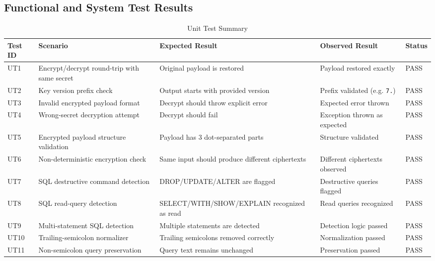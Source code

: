 \subsection{Functional and System Test Results}

\begin{table}[H]
    \centering
    \caption{Unit Test Summary}
    \label{tab:test-summary}
    \begin{tabular}{|p{}|p{}|p{}|p{}|p{}|}
        \hline
        \textbf{Test ID} & \textbf{Scenario} & \textbf{Expected Result} & \textbf{Observed Result} & \textbf{Status} \\
        \hline
        UT1 & Encrypt/decrypt round-trip with same secret & Original payload is restored & Payload restored exactly & PASS \\
        \hline
        UT2 & Key version prefix check & Output starts with provided version & Prefix validated (e.g. \texttt{7.}) & PASS \\
        \hline
        UT3 & Invalid encrypted payload format & Decrypt should throw explicit error & Expected error thrown & PASS \\
        \hline
        UT4 & Wrong-secret decryption attempt & Decrypt should fail & Exception thrown as expected & PASS \\
        \hline
        UT5 & Encrypted payload structure validation & Payload has 3 dot-separated parts & Structure validated & PASS \\
        \hline
        UT6 & Non-deterministic encryption check & Same input should produce different ciphertexts & Different ciphertexts observed & PASS \\
        \hline
        UT7 & SQL destructive command detection & DROP/UPDATE/ALTER are flagged & Destructive queries flagged & PASS \\
        \hline
        UT8 & SQL read-query detection & SELECT/WITH/SHOW/EXPLAIN recognized as read & Read queries recognized & PASS \\
        \hline
        UT9 & Multi-statement SQL detection & Multiple statements are detected & Detection logic passed & PASS \\
        \hline
        UT10 & Trailing-semicolon normalizer & Trailing semicolons removed correctly & Normalization passed & PASS \\
        \hline
        UT11 & Non-semicolon query preservation & Query text remains unchanged & Preservation passed & PASS \\

\end{tabular}
\end{table}
